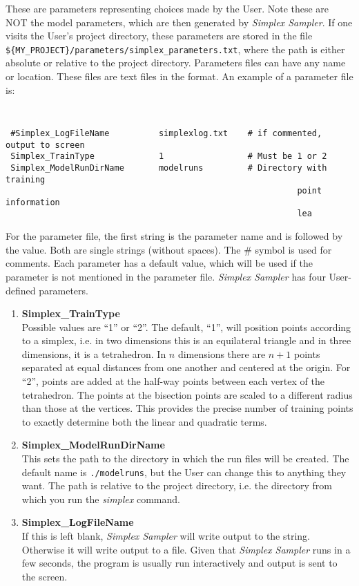 \documentclass[UserManual.tex]{subfiles}
\begin{document}
These are parameters representing choices made by the User. Note these are NOT the model parameters, which are then generated by {\it Simplex Sampler}. If one visits the User's project directory, these parameters are stored in the file   {\tt \$\{MY\_PROJECT\}/parameters/simplex\_parameters.txt}, where the path is either absolute or relative to the project directory.
Parameters files can have any name or location. These files are text files in the format. An example of a parameter file is:
{\tt
\begin{verbatim}
 #Simplex_LogFileName          simplexlog.txt    # if commented, output to screen
 Simplex_TrainType             1                 # Must be 1 or 2
 Simplex_ModelRunDirName       modelruns         # Directory with training
                                                           point information
                                                           lea
\end{verbatim}
}
For the parameter file, the first string is the parameter name and is followed by the value. Both are single strings (without spaces). The \# symbol is used for comments. Each parameter has a default value, which will be used if the parameter is not mentioned in the parameter file.  {\it Simplex Sampler} has four User-defined parameters.
\begin{enumerate}\itemsep 0pt
    \item {\bf Simplex\_TrainType}\\
Possible values are ``1'' or ``2''. The default, ``1'', will position points according to a simplex, i.e. in two dimensions this is an equilateral triangle and in three dimensions, it is a tetrahedron. In $n$ dimensions there are $n+1$ points separated at equal distances from one another and centered at the origin. For ``2'', points are added at the half-way points between each vertex of the tetrahedron. The points at the bisection points are scaled to a different radius than those at the vertices. This provides the precise number of training points to exactly determine both the linear and quadratic terms.
\item {\bf Simplex\_ModelRunDirName}\\
This sets the path to the directory in which the run files will be created. The default name is {\tt ./modelruns}, but the User can change this to anything they want. The path is relative to the project directory, i.e. the directory from which you run the {\it simplex} command.
\item {\bf Simplex\_LogFileName}\\
If this is left blank, {\it Simplex Sampler} will write output to the string. Otherwise it will write output to a file. Given that {\it Simplex Sampler} runs in a few seconds, the program is usually run interactively and output is sent to the screen.
\end{enumerate}
\end{document}
